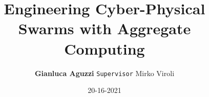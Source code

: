 

\title{Engineering Cyber-Physical Swarms with Aggregate Computing}
\author[G.Aguzzi]{
  \textbf{Gianluca Aguzzi}
  \texttt{Supervisor} Mirko Viroli
}
\date{ 20-16-2021 }
\talk{ }
